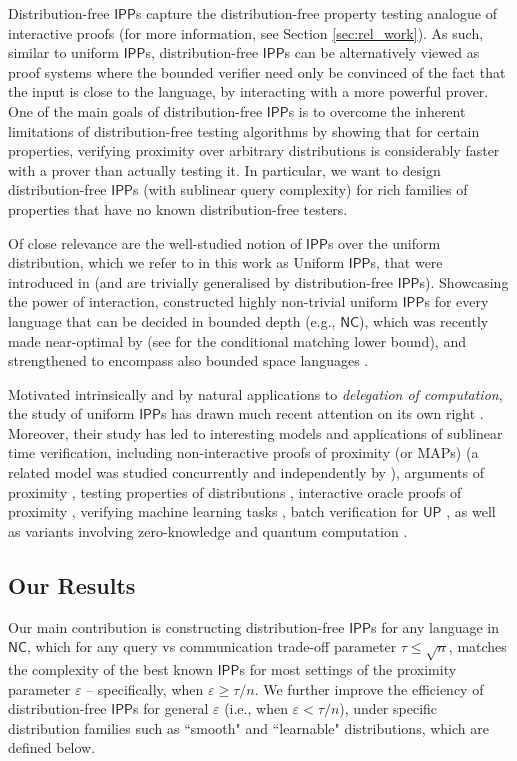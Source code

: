 \documentclass[11pt]{article}
\newcommand{\NC}{\mathsf{NC}}
\newcommand{\IPP}{\mathsf{IPP}}
\begin{document}
Distribution-free $\IPP$s capture the distribution-free property testing analogue of interactive proofs (for more information, see Section \ref{sec:rel_work}). As such, similar to uniform $\IPP$s, distribution-free $\IPP$s can be alternatively viewed as proof systems where the bounded verifier need only be convinced of the fact that the input is close to the language, by interacting with a more powerful prover. One of the main goals of distribution-free $\IPP$s is to overcome the inherent limitations of distribution-free testing algorithms by showing that for certain properties, verifying proximity over arbitrary distributions is considerably faster with a prover than actually testing it. In particular, we want to design distribution-free $\IPP$s (with sublinear query complexity) for rich families of properties that have no known distribution-free testers.

Of close relevance are the well-studied notion of $\IPP$s over the uniform distribution, which we refer to in this work as Uniform $\IPP$s, that were introduced in \cite{EKR04,RVW} (and are trivially generalised by distribution-free $\IPP$s). Showcasing the power of interaction, \cite{RVW} constructed highly non-trivial uniform $\IPP$s for every language that can be decided in bounded depth (e.g., $\NC$), which was recently made near-optimal by \cite{RR20_batch_polylog} (see \cite{KR15} for the conditional matching lower bound), and strengthened to encompass also bounded space languages \cite{RRR21}. 

Motivated intrinsically and by natural applications to \textit{delegation of computation}, the study of uniform $\IPP$s has drawn much recent attention on its own right \cite{RVW,GR18,KR15,RRR21,GG21_universal,GR22_sample}. Moreover, their study has led to interesting models and applications of sublinear time verification, including non-interactive proofs of proximity (or \textsf{MAP}s) \cite{GR18} (a related model was studied concurrently and independently by \cite{FGL14}), arguments of proximity \cite{KR15}, testing properties of distributions \cite{CG18,HR22}, interactive oracle proofs of proximity \cite{RRR21,BBHR18,RR20,BLNR22}, verifying machine learning tasks \cite{GRSY21}, batch verification for $\mathsf{UP}$ \cite{RRR18,RR20_batch_polylog}, as well as variants involving zero-knowledge \cite{BRV18} and quantum computation \cite{DGMT22}. 

\subsection{Our Results}
\label{sec:results}
Our main contribution is constructing distribution-free $\IPP$s for any language in $\NC$, which for any query vs communication trade-off parameter $\tau \leq \sqrt{n}$, matches the complexity of the best known $\IPP$s for most settings of the proximity parameter $\varepsilon$ -- specifically, when $\varepsilon \geq \tau/n$. We further improve the efficiency of distribution-free $\IPP$s for general $\varepsilon$ (i.e., when $\varepsilon<\tau/n$), under specific distribution families such as ``smooth" and ``learnable" distributions, which are defined below.
\end{document}
